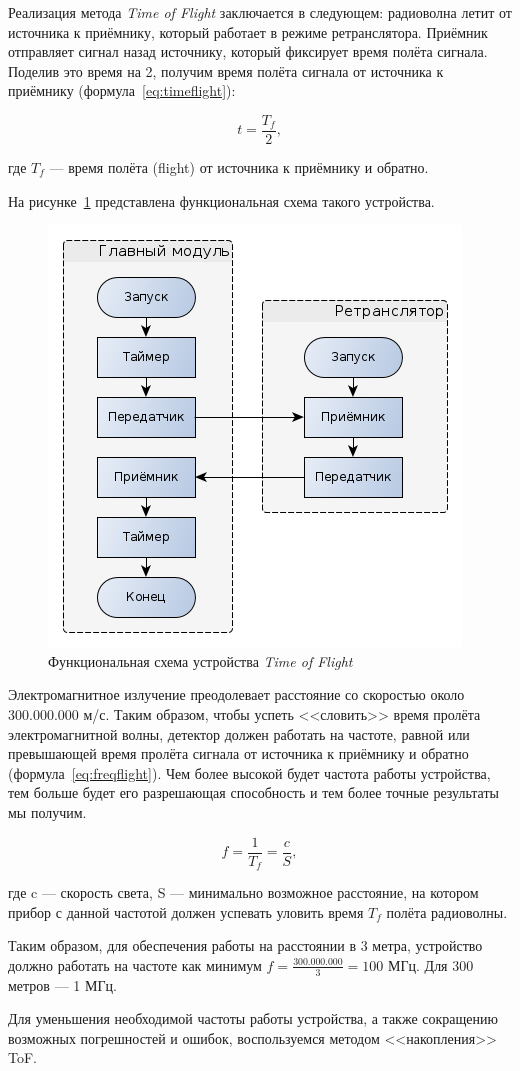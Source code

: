 Реализация метода \textit{Time of Flight} заключается в следующем: радиоволна летит от источника к приёмнику, который работает в режиме ретранслятора. Приёмник отправляет сигнал назад источнику, который фиксирует время полёта сигнала. Поделив это время на 2, получим время полёта сигнала от источника к приёмнику (формула~\eqref{eq:timeflight}):

\begin{equation}
    \label{eq:timeflight}
    t = \frac{T_f}{2},
\end{equation}

где $T_f$ --- время полёта (flight) от источника к приёмнику и обратно.

На рисунке~\ref{fig:tofscheme} представлена функциональная схема такого устройства.

\begin{figure}[ht]
    \includegraphics[width=.65\linewidth]{Figures/tofscheme.png}
    \caption{Функциональная схема устройства \textit{Time of Flight}}
    \label{fig:tofscheme}
\end{figure}

Электромагнитное излучение преодолевает расстояние со скоростью около 300.000.000 м/с. Таким образом, чтобы успеть <<словить>> время пролёта электромагнитной волны, детектор должен работать на частоте, равной или превышающей время пролёта сигнала от источника к приёмнику и обратно (формула~\eqref{eq:freqflight}). Чем более высокой будет частота работы устройства, тем больше будет его разрешающая способность и тем более точные результаты мы получим.

\begin{equation}
    \label{eq:freqflight}
    f = \frac{1}{T_f} = \frac{c}{S},
\end{equation}

где c --- скорость света, S --- минимально возможное расстояние, на котором прибор с данной частотой должен успевать уловить время $T_f$ полёта радиоволны.

Таким образом, для обеспечения работы на расстоянии в 3 метра, устройство должно работать на частоте как минимум $f = \frac{300.000.000}{3} = 100$ МГц. Для 300 метров --- 1 МГц.

Для уменьшения необходимой частоты работы устройства, а также сокращению возможных погрешностей и ошибок, воспользуемся методом <<накопления>> ToF.
